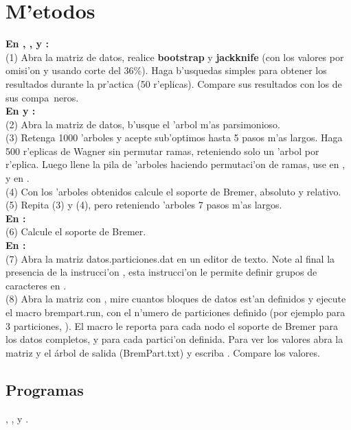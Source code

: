 \section{M'etodos}
\noindent
\textbf{En , ,  y :}\\
(1) Abra la matriz de datos, realice \textbf{bootstrap} y \textbf{jackknife} (con los valores por omisi'on y usando corte del 36\%). Haga b'usquedas simples para obtener los resultados durante la pr'actica (50 r'eplicas). Compare sus resultados con los de sus compa~neros.\\
\textbf{En  y :}\\
(2) Abra la matriz de datos, b'usque el 'arbol m'as parsimonioso.\\
(3) Retenga 1000 'arboles y acepte sub'optimos hasta  5 pasos m'as largos. 
Haga 500 r'eplicas de Wagner sin permutar ramas, reteniendo solo un 'arbol por r'eplica. Luego llene la pila de 'arboles haciendo permutaci'on de ramas, use  en , y en  .\\
(4) Con los 'arboles obtenidos calcule el soporte de Bremer, absoluto y relativo.\\
(5) Repita (3) y (4), pero reteniendo 'arboles 7 pasos m'as largos.\\
\textbf{En :}\\
(6) Calcule el soporte de Bremer.\\
\textbf{En :}\\
(7) Abra la matriz datos.particiones.dat en un editor de texto. Note al final la presencia de la instrucci'on , esta instrucci'on le permite definir grupos de caracteres en .\\
(8) Abra la matriz con , mire cuantos bloques de datos est'an definidos y ejecute el macro brempart.run, con el n'umero de particiones definido (por ejemplo para 3 particiones, ). El macro le reporta para cada nodo el soporte de Bremer para los datos completos, y para cada partici'on definida. Para ver los valores abra la matriz y el \'arbol de salida (BremPart.txt) y escriba . Compare los valores.
\subsection{Programas}
\noindent
{}, ,  y .
